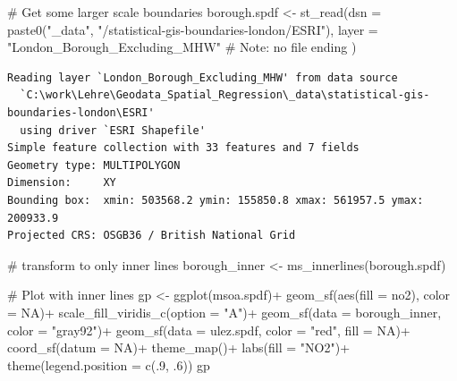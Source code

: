 \documentclass[
  letterpaper,
]{scrbook}
\newenvironment{Shaded}{\begin{snugshade}}{\end{snugshade}}
\newcommand{\AttributeTok}[1]{\textcolor[rgb]{0.40,0.45,0.13}{#1}}
\newcommand{\CommentTok}[1]{\textcolor[rgb]{0.37,0.37,0.37}{#1}}
\newcommand{\ConstantTok}[1]{\textcolor[rgb]{0.56,0.35,0.01}{#1}}
\newcommand{\DecValTok}[1]{\textcolor[rgb]{0.68,0.00,0.00}{#1}}
\newcommand{\FunctionTok}[1]{\textcolor[rgb]{0.28,0.35,0.67}{#1}}
\newcommand{\NormalTok}[1]{\textcolor[rgb]{0.00,0.23,0.31}{#1}}
\newcommand{\OtherTok}[1]{\textcolor[rgb]{0.00,0.23,0.31}{#1}}
\newcommand{\SpecialCharTok}[1]{\textcolor[rgb]{0.37,0.37,0.37}{#1}}
\newcommand{\StringTok}[1]{\textcolor[rgb]{0.13,0.47,0.30}{#1}}
\begin{document}
\begin{Shaded}
\begin{Highlighting}[]
\CommentTok{\# Get some larger scale boundaries}
\NormalTok{borough.spdf }\OtherTok{\textless{}{-}} \FunctionTok{st\_read}\NormalTok{(}\AttributeTok{dsn =} \FunctionTok{paste0}\NormalTok{(}\StringTok{"\_data"}\NormalTok{, }\StringTok{"/statistical{-}gis{-}boundaries{-}london/ESRI"}\NormalTok{),}
                     \AttributeTok{layer =} \StringTok{"London\_Borough\_Excluding\_MHW"} \CommentTok{\# Note: no file ending}
\NormalTok{                     )}
\end{Highlighting}
\end{Shaded}

\begin{verbatim}
Reading layer `London_Borough_Excluding_MHW' from data source 
  `C:\work\Lehre\Geodata_Spatial_Regression\_data\statistical-gis-boundaries-london\ESRI' 
  using driver `ESRI Shapefile'
Simple feature collection with 33 features and 7 fields
Geometry type: MULTIPOLYGON
Dimension:     XY
Bounding box:  xmin: 503568.2 ymin: 155850.8 xmax: 561957.5 ymax: 200933.9
Projected CRS: OSGB36 / British National Grid
\end{verbatim}

\begin{Shaded}
\begin{Highlighting}[]
\CommentTok{\# transform to only inner lines}
\NormalTok{borough\_inner }\OtherTok{\textless{}{-}} \FunctionTok{ms\_innerlines}\NormalTok{(borough.spdf)}

\CommentTok{\# Plot with inner lines}
\NormalTok{gp }\OtherTok{\textless{}{-}} \FunctionTok{ggplot}\NormalTok{(msoa.spdf)}\SpecialCharTok{+}
    \FunctionTok{geom\_sf}\NormalTok{(}\FunctionTok{aes}\NormalTok{(}\AttributeTok{fill =}\NormalTok{ no2), }\AttributeTok{color =} \ConstantTok{NA}\NormalTok{)}\SpecialCharTok{+}
    \FunctionTok{scale\_fill\_viridis\_c}\NormalTok{(}\AttributeTok{option =} \StringTok{"A"}\NormalTok{)}\SpecialCharTok{+}
    \FunctionTok{geom\_sf}\NormalTok{(}\AttributeTok{data =}\NormalTok{ borough\_inner, }\AttributeTok{color =} \StringTok{"gray92"}\NormalTok{)}\SpecialCharTok{+}
    \FunctionTok{geom\_sf}\NormalTok{(}\AttributeTok{data =}\NormalTok{ ulez.spdf, }\AttributeTok{color =} \StringTok{"red"}\NormalTok{, }\AttributeTok{fill =} \ConstantTok{NA}\NormalTok{)}\SpecialCharTok{+}
    \FunctionTok{coord\_sf}\NormalTok{(}\AttributeTok{datum =} \ConstantTok{NA}\NormalTok{)}\SpecialCharTok{+}
    \FunctionTok{theme\_map}\NormalTok{()}\SpecialCharTok{+}
    \FunctionTok{labs}\NormalTok{(}\AttributeTok{fill =} \StringTok{"NO2"}\NormalTok{)}\SpecialCharTok{+}
    \FunctionTok{theme}\NormalTok{(}\AttributeTok{legend.position =} \FunctionTok{c}\NormalTok{(.}\DecValTok{9}\NormalTok{, .}\DecValTok{6}\NormalTok{))}
\NormalTok{gp}
\end{Highlighting}
\end{Shaded}
\end{document}
